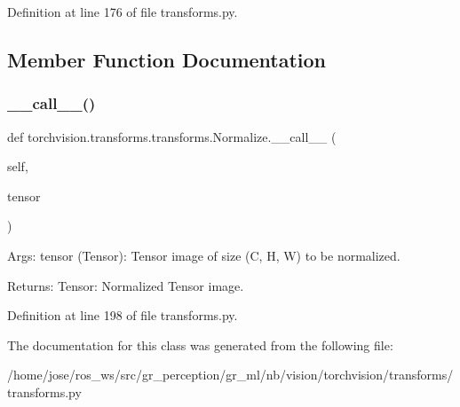 Definition at line 176 of file transforms.\+py.



\subsection{Member Function Documentation}
\mbox{\label{classtorchvision_1_1transforms_1_1transforms_1_1Normalize_a476404e1bf4cd9e7ce9cba23bea2c3ee}} 
\subsubsection{\texorpdfstring{\+\_\+\+\_\+call\+\_\+\+\_\+()}{\_\_call\_\_()}}
{\footnotesize\ttfamily def torchvision.\+transforms.\+transforms.\+Normalize.\+\_\+\+\_\+call\+\_\+\+\_\+ (\begin{DoxyParamCaption}\item[{}]{self,  }\item[{}]{tensor }\end{DoxyParamCaption})}

\begin{DoxyVerb}Args:
    tensor (Tensor): Tensor image of size (C, H, W) to be normalized.

Returns:
    Tensor: Normalized Tensor image.
\end{DoxyVerb}
 

Definition at line 198 of file transforms.\+py.



The documentation for this class was generated from the following file\+:\begin{DoxyCompactItemize}
\item 
/home/jose/ros\+\_\+ws/src/gr\+\_\+perception/gr\+\_\+ml/nb/vision/torchvision/transforms/transforms.\+py\end{DoxyCompactItemize}
